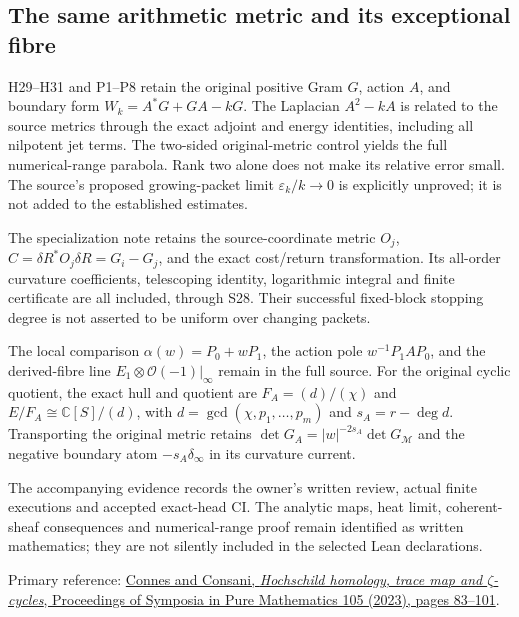 \documentclass{article}
\begin{document}
\subsection{The same arithmetic metric and its exceptional fibre}

H29--H31 and P1--P8 retain the original positive Gram $G$, action
$A$, and boundary form $W_k=A^*G+GA-kG$. The Laplacian
$A^2-kA$ is related to the source metrics through the exact
adjoint and energy identities, including all nilpotent jet terms.
The two-sided original-metric control yields the full numerical-range
parabola. Rank two alone does not make its relative error small.
The source's proposed growing-packet limit $\varepsilon_k/k\to0$
is explicitly unproved; it is not added to the established estimates.

The specialization note retains the source-coordinate metric
$O_j$, $C=\delta R^*O_j\delta R=G_i-G_j$, and the exact
cost/return transformation. Its all-order curvature coefficients,
telescoping identity, logarithmic integral and finite certificate
are all included, through S28. Their successful fixed-block stopping
degree is not asserted to be uniform over changing packets.

The local comparison $\alpha(w)=P_0+wP_1$, the action pole
$w^{-1}P_1AP_0$, and the derived-fibre line
$E_1\otimes\mathcal O(-1)|_\infty$ remain in the full source.
For the original cyclic quotient, the exact hull and quotient are
$F_A=(d)/(\chi)$ and $E/F_A\cong\mathbb C[S]/(d)$, with
$d=\gcd(\chi,p_1,\ldots,p_m)$ and $s_A=r-\deg d$.
Transporting the original metric retains
$\det G_A=|w|^{-2s_A}\det G_{\mathscr M}$ and the negative
boundary atom $-s_A\delta_\infty$ in its curvature current.

The accompanying evidence records the owner's written review,
actual finite executions and accepted exact-head CI. The analytic
maps, heat limit, coherent-sheaf consequences and numerical-range
proof remain identified as written mathematics; they are not
silently included in the selected Lean declarations.

Primary reference:
\href{https://doi.org/10.1090/pspum/105/01896}
{Connes and Consani, \emph{Hochschild homology, trace map and
$\zeta$-cycles}, Proceedings of Symposia in Pure Mathematics 105
(2023), pages 83--101}.
\end{document}

